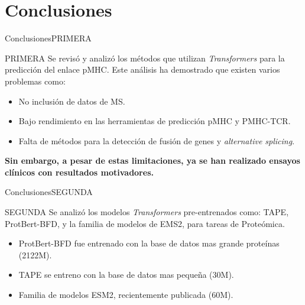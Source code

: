 \documentclass[10pt]{beamer}
\newcommand{\1}{
	\setbeamertemplate{background}{
		\texttt{[image: img/1]}
		\tikz[overlay] \fill[fill opacity=0.75,fill=white] (0,0) rectangle (-\paperwidth,\paperheight);
	}
}
\begin{document}
\section{Conclusiones}

\begin{frame}{Conclusiones}{PRIMERA}
	
	\begin{block}{PRIMERA}
		Se revisó y analizó los métodos que utilizan \textit{Transformers} para la predicción del enlace pMHC.  Este análisis ha demostrado que existen varios problemas como: 
		\pause
		\begin{itemize}
			\item No inclusión de datos de MS.\pause
			\item Bajo rendimiento en las herramientas de predicción pMHC y PMHC-TCR.\pause
			\item Falta de métodos para la detección de fusión de genes y \textit{alternative splicing}.
		\end{itemize}

	\pause
		\textbf{Sin embargo, a pesar de estas limitaciones, ya se han realizado ensayos clínicos con resultados motivadores.}
	\end{block}
	
	
\end{frame}

\begin{frame}{Conclusiones}{SEGUNDA}	
	\begin{block}{SEGUNDA}
		Se analizó los modelos \textit{Transformers} pre-entrenados como: TAPE, ProtBert-BFD, y la familia de modelos de EMS2, para tareas de Proteómica.
			\pause
		
		\begin{itemize}
			\item ProtBert-BFD fue entrenado con la base de datos mas grande proteínas (2122M). \pause
			\item TAPE se entreno con la base de datos mas pequeña (30M). \pause
			\item Familia de modelos ESM2, recientemente publicada (60M). 
		\end{itemize}	
	
	\end{block}	
\end{frame}
\end{document}

